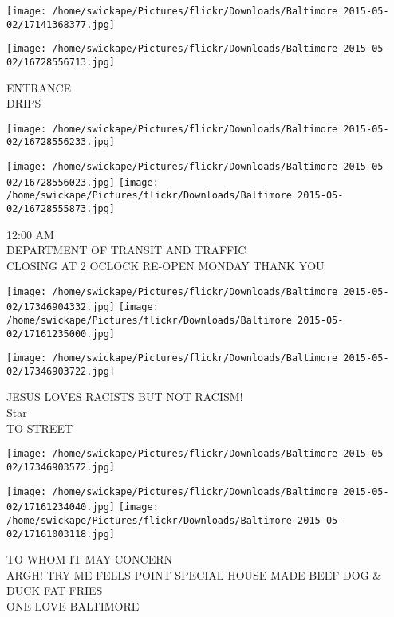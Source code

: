 \documentclass[10pt,letterpaper]{article}
\begin{document}
\texttt{[image: /home/swickape/Pictures/flickr/Downloads/Baltimore 2015-05-02/17141368377.jpg]}

\vspace{0.25in}
\texttt{[image: /home/swickape/Pictures/flickr/Downloads/Baltimore 2015-05-02/16728556713.jpg]}

ENTRANCE\\
DRIPS\\
\pagebreak

\texttt{[image: /home/swickape/Pictures/flickr/Downloads/Baltimore 2015-05-02/16728556233.jpg]}

\vspace{0.25in}
\texttt{[image: /home/swickape/Pictures/flickr/Downloads/Baltimore 2015-05-02/16728556023.jpg]}
\texttt{[image: /home/swickape/Pictures/flickr/Downloads/Baltimore 2015-05-02/16728555873.jpg]}

12:00 AM\\
DEPARTMENT OF TRANSIT AND TRAFFIC\\
CLOSING AT 2 OCLOCK RE{-}OPEN MONDAY THANK YOU\\
\pagebreak

\texttt{[image: /home/swickape/Pictures/flickr/Downloads/Baltimore 2015-05-02/17346904332.jpg]}
\texttt{[image: /home/swickape/Pictures/flickr/Downloads/Baltimore 2015-05-02/17161235000.jpg]}

\texttt{[image: /home/swickape/Pictures/flickr/Downloads/Baltimore 2015-05-02/17346903722.jpg]}

JESUS LOVES RACISTS BUT NOT RACISM!\\
Star\\
TO STREET\\
\pagebreak

\texttt{[image: /home/swickape/Pictures/flickr/Downloads/Baltimore 2015-05-02/17346903572.jpg]}

\vspace{0.25in}
\texttt{[image: /home/swickape/Pictures/flickr/Downloads/Baltimore 2015-05-02/17161234040.jpg]}
\texttt{[image: /home/swickape/Pictures/flickr/Downloads/Baltimore 2015-05-02/17161003118.jpg]}

TO WHOM IT MAY CONCERN\\
ARGH!  TRY ME FELLS POINT SPECIAL HOUSE MADE BEEF DOG \& DUCK FAT FRIES\\
ONE LOVE BALTIMORE\\
\pagebreak
\end{document}
